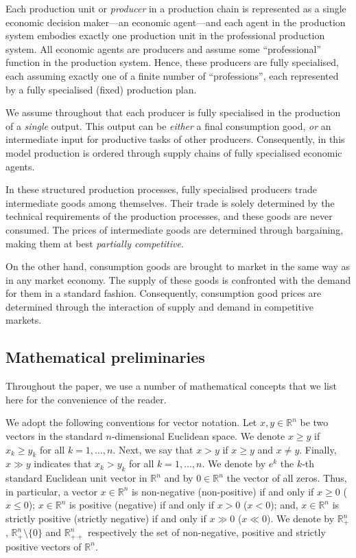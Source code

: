 \documentclass[11pt,fleqn]{article}
\begin{document}
Each production unit or \emph{producer} in a production chain is represented as a single economic decision maker---an economic agent---and each agent in the production system embodies exactly one production unit in the professional production system. All economic agents are producers and assume some ``professional'' function in the production system. Hence, these producers are fully specialised, each assuming exactly one of a finite number of ``professions'', each represented by a fully specialised (fixed) production plan.

We assume throughout that each producer is fully specialised in the production of a \emph{single} output. This output can be \emph{either} a final consumption good, \emph{or} an intermediate input for productive tasks of other producers.  Consequently, in this model production is ordered through supply chains of fully specialised economic agents. 

In these structured production processes, fully specialised producers trade intermediate goods among themselves. Their trade is solely determined by the technical requirements of the production processes, and these goods are never consumed. The prices of intermediate goods are determined through bargaining, making them at best \emph{partially competitive}.

On the other hand, consumption goods are brought to market in the same way as in any market economy. The supply of these goods is confronted with the demand for them in a standard fashion. Consequently, consumption good prices are determined through the interaction of supply and demand in competitive markets.

\subsection{Mathematical preliminaries}


Throughout the paper, we use a number of mathematical concepts that we list here for the convenience of the reader.

We adopt the following conventions for vector notation. Let $x, y \in \mathbb{R}^n$ be two vectors in the standard $n$-dimensional Euclidean space. We denote $x \geqslant y$ if $x_k \geqslant y_k$ for all $k = 1, \ldots, n$. Next, we say that $x > y$ if $x \geqslant y$ and $x \neq y$. Finally, $x \gg y$ indicates that $x_k > y_k$ for all $k = 1, \ldots, n$. We denote by $e^k$ the $k$-th standard Euclidean unit vector in $\mathbb{R}^n$ and by $0\in \mathbb R^n$ the vector of all zeros.  Thus, in particular, a vector $x \in \mathbb R^n$ is non-negative (non-positive) if and only if $x \geqslant 0$ ($x \leqslant 0$); $x \in \mathbb R^n$ is positive (negative) if and only if $x > 0$ ($x < 0$); and, $x \in \mathbb R^n$ is strictly positive (strictly negative) if and only if $x \gg 0$ ($x \ll 0$). We denote by $\mathbb{R}^n_+$, $\mathbb{R}^n_+ \setminus \{0\}$ and $\mathbb{R}^n_{++}$ respectively the set of non-negative, positive and strictly positive vectors of $\mathbb{R}^n$. 
\end{document}
